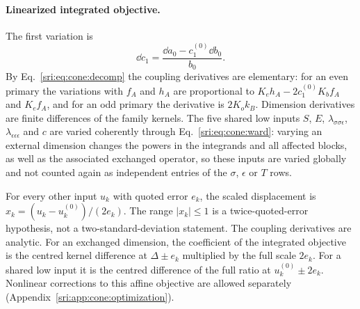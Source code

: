\paragraph{Linearized integrated objective.} The first variation is
\begin{equation}
 \dd c_1=\frac{\dd a_0-c_1^{(0)}\dd b_0}{b_0}.
 \label{sri:eq:cone:variation}
\end{equation}
By Eq.~\eqref{sri:eq:cone:decomp} the coupling derivatives are elementary: for an even primary the variations with $f_A$
and $h_A$ are proportional to $K_eh_A-2c_1^{(0)}K_bf_A$ and $K_ef_A$, and for an odd primary the derivative is
$2K_ok_B$. Dimension derivatives are finite differences of the family kernels. The five shared low inputs $S$, $E$,
$\lambda_{\sigma\sigma\epsilon}$, $\lambda_{\epsilon\epsilon\epsilon}$ and $c$ are varied coherently through
Eq.~\eqref{sri:eq:cone:ward}: varying an external dimension changes the powers in the integrands and all affected blocks,
as well as the associated exchanged operator, so these inputs are varied globally and not counted again as independent
entries of the $\sigma$, $\epsilon$ or $T$ rows.

For every other input $u_k$ with quoted error $e_k$, the scaled displacement is $x_k=(u_k-u_k^{(0)})/(2e_k)$. The range
$|x_k|\le1$ is a twice-quoted-error hypothesis, not a two-standard-deviation statement. The coupling derivatives are
analytic. For an exchanged dimension, the coefficient of the integrated objective is the centred kernel difference at
$\Delta\pm e_k$ multiplied by the full scale $2e_k$. For a shared low input it is the centred difference of the full
ratio at $u_k^{(0)}\pm2e_k$. Nonlinear corrections to this affine objective are allowed separately
(Appendix~\ref{sri:app:cone:optimization}).

